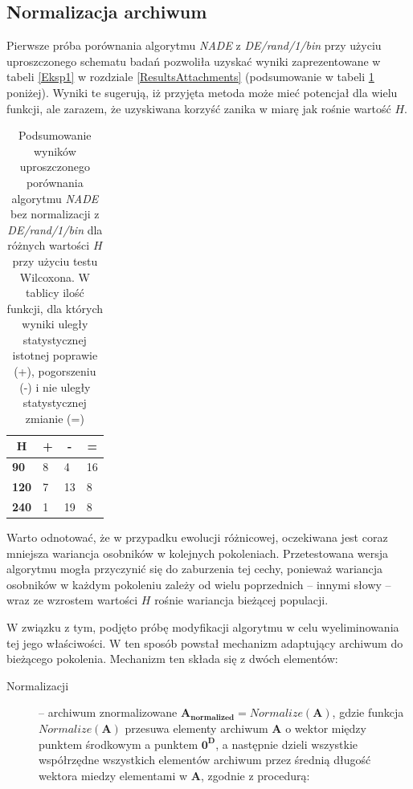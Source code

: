 \documentclass[12pt,a4paper]{report}
\begin{document}
{{{{{{\subsection{Normalizacja archiwum}
\par{
Pierwsze próba porównania algorytmu \emph{NADE} z \emph{DE/rand/1/bin} przy użyciu uproszczonego schematu badań pozwoliła uzyskać wyniki zaprezentowane w tabeli \ref{Eksp1} w rozdziale \ref{ResultsAttachments} (podsumowanie w tabeli \ref{Eksp1short} poniżej). Wyniki te sugerują, iż przyjęta metoda może mieć potencjał dla wielu funkcji, ale zarazem, że uzyskiwana korzyść zanika w miarę jak rośnie wartość $H$.
}
\begin{table}[h]
\centering
\caption{Podsumowanie wyników uproszczonego porównania algorytmu \emph{NADE} bez normalizacji z \emph{DE/rand/1/bin} dla różnych wartości $H$ przy użyciu testu Wilcoxona. W tablicy ilość funkcji, dla których wyniki uległy statystycznej istotnej poprawie (+), pogorszeniu (-) i nie uległy statystycznej zmianie (=)}
\label{Eksp1short}
\begin{tabular}{|l|l|l|l|}
\hline
\multicolumn{1}{|c|}{{\bf H}} & \multicolumn{1}{c|}{{\bf +}} & \multicolumn{1}{c|}{{\bf -}} & \multicolumn{1}{c|}{{\bf =}} \\ \hline
{\bf 90}  & 8 & 4  & 16 \\ \hline
{\bf 120} & 7 & 13 & 8  \\ \hline
{\bf 240} & 1 & 19 & 8  \\ \hline
\end{tabular}
\end{table}
\par{
Warto odnotować, że w przypadku ewolucji różnicowej, oczekiwana jest coraz mniejsza wariancja osobników w kolejnych pokoleniach. Przetestowana wersja algorytmu mogła przyczynić się do zaburzenia tej cechy, ponieważ wariancja osobników w każdym pokoleniu zależy od wielu poprzednich -- innymi słowy -- wraz ze wzrostem wartości $H$ rośnie wariancja bieżącej populacji.
}
\par{
W związku z tym, podjęto próbę modyfikacji algorytmu w celu wyeliminowania tej jego właściwości. W ten sposób powstał mechanizm adaptujący archiwum do bieżącego pokolenia. Mechanizm ten składa się z dwóch elementów:
\begin{description}
\item[Normalizacji] -- archiwum znormalizowane $\mathbf{A_{normalized}} = Normalize(\mathbf{A})$, gdzie funkcja $Normalize(\mathbf{A})$ przesuwa elementy archiwum $\mathbf{A}$ o wektor między punktem środkowym a punktem $\mathbf{0^D}$, a następnie dzieli wszystkie współrzędne wszystkich elementów archiwum przez średnią długość wektora miedzy elementami w $\mathbf{A}$, zgodnie z procedurą:


\end{description}}}}}}}}
\end{document}
